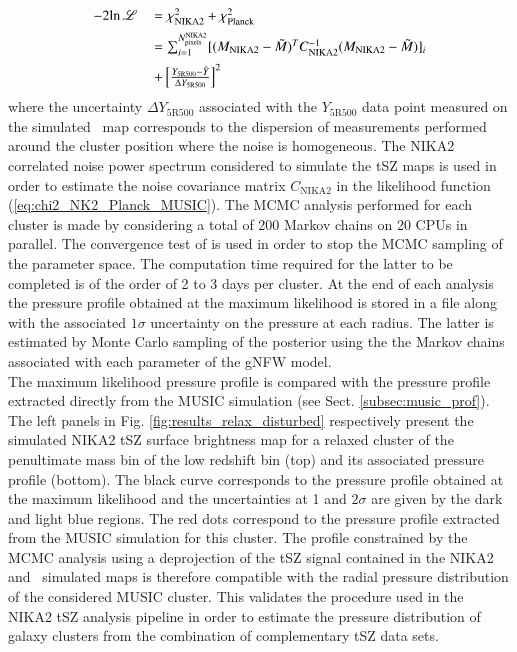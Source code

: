 \documentclass[twocolumn,traditabstract]{aa}
\begin{document}
\begin{equation}
\begin{tabular}{rl}
        $-2 \mathrm{ln} \, \mathscr{L}$  & $ =\chi^2_{\mathrm{NIKA2}} + \chi^2_{\mathrm{Planck}}$\\[0.2cm]
         &$ =\sum_{i=1}^{N_{\mathrm{pixels}}^{\mathrm{NIKA2}}} [(M_{\mathrm{NIKA2}} - \tilde{M})^T C_{\mathrm{NIKA2}}^{-1} (M_{\mathrm{NIKA2}} - \tilde{M})]_i $ \\[0.2cm]
         & $ + \left[\frac{Y_{\mathrm{5R500}} - \tilde{Y}}{\Delta Y_{\mathrm{5R500}}}\right]^2 $
\label{eq:chi2_NK2_Planck_MUSIC}
\end{tabular}
\end{equation}
where the uncertainty $\Delta Y_{\mathrm{5R500}}$ associated with the $Y_{\mathrm{5R500}}$ data point measured on the simulated \planck\ map corresponds to the dispersion of measurements performed around the cluster position where the noise is homogeneous. The NIKA2 correlated noise power spectrum considered to simulate the tSZ maps is used in order to estimate the noise covariance matrix $C_{\mathrm{NIKA2}}$ in the likelihood function (\ref{eq:chi2_NK2_Planck_MUSIC}). The MCMC analysis performed for each cluster is made by considering a total of 200 Markov chains on 20 CPUs in parallel. The convergence test of \cite{gel92} is used in order to stop the MCMC sampling of the parameter space. The computation time required for the latter to be completed is of the order of 2 to 3 days per cluster. At the end of each analysis the pressure profile obtained at the maximum likelihood is stored in a file along with the associated $1\sigma$ uncertainty on the pressure at each radius. The latter is estimated by Monte Carlo sampling of the posterior using the the Markov chains associated with each parameter of the gNFW model.\\

The maximum likelihood pressure profile is compared with the pressure profile extracted directly from the MUSIC simulation (see Sect. \ref{subsec:music_prof}). The left panels in Fig. \ref{fig:results_relax_disturbed} respectively present the simulated NIKA2 tSZ surface brightness map for a relaxed cluster of the penultimate mass bin of the low redshift bin (top) and its associated pressure profile (bottom). The black curve corresponds to the pressure profile obtained at the maximum likelihood and the uncertainties at 1 and $2\sigma$ are given by the dark and light blue regions. The red dots correspond to the pressure profile extracted from the MUSIC simulation for this cluster. The profile constrained by the MCMC analysis using a deprojection of the tSZ signal contained in the NIKA2 and \planck\ simulated maps is therefore compatible with the radial pressure distribution of the considered MUSIC cluster. This validates the procedure used in the NIKA2 tSZ analysis pipeline in order to estimate the pressure distribution of galaxy clusters from the combination of complementary tSZ data sets.\\
\end{document}

